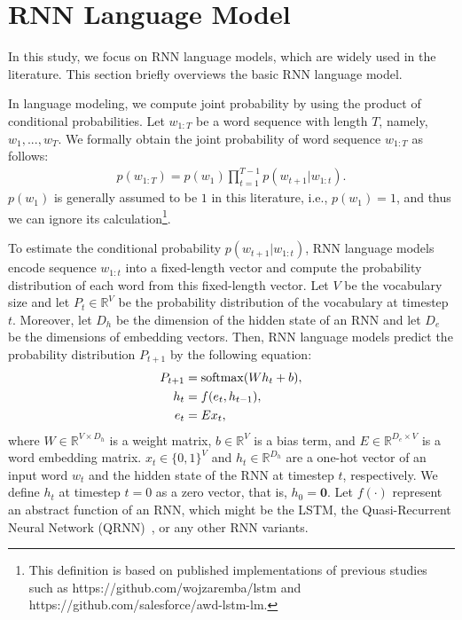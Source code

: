\documentclass[letterpaper]{article} %
\begin{document}
\section{RNN Language Model}
In this study, we focus on RNN language models, which are widely used in the literature.
This section briefly overviews the basic RNN language model.

In language modeling, we compute joint probability by using the product of conditional probabilities.
Let $w_{1:T}$ be a word sequence with length $T$, namely, $w_1, ..., w_T$.
We formally obtain the joint probability of word sequence $w_{1:T}$ as follows:
\begin{align}
  p(w_{1:T}) = p(w_1)\prod_{t=1}^{T-1} p(w_{t+1} | w_{1:t}). \label{eq:def_lm}
\end{align}
$p(w_1)$ is generally assumed to be $1$ in this literature, i.e., $p(w_1)\!=\!1$, and thus we can ignore its calculation\footnote{This definition is based on published implementations of previous studies such as https://github.com/wojzaremba/lstm and https://github.com/salesforce/awd-lstm-lm.}.


To estimate the conditional probability $p(w_{t+1} | w_{1:t})$, RNN language models encode sequence $w_{1:t}$ into a fixed-length vector and compute the probability distribution of each word from this fixed-length vector.
Let $V$ be the vocabulary size and let $P_{t} \in \mathbb{R}^{V}$ be the probability distribution of the vocabulary at timestep $t$.
Moreover, let $D_{h}$ be the dimension of the hidden state of an RNN and let $D_e$ be the dimensions of embedding vectors.
Then, RNN language models predict the probability distribution $P_{t+1}$ by the following equation:
\begin{align}
  P_{t+1} &= {\rm softmax}(W h_t + b), \label{eq:softmax} \\
  h_t &= f(e_t, h_{t-1}), \label{eq:rnn} \\
  e_t &= E x_t, \label{eq:embed}
\end{align}
where $W \in \mathbb{R}^{V \times D_h}$ is a weight matrix, $b \in \mathbb{R}^{V}$ is a bias term, and $E \in \mathbb{R}^{D_e \times V}$ is a word embedding matrix.
$x_t \in \{0,1\}^{V}$ and $h_{t} \in \mathbb{R}^{D_h}$ are a one-hot vector of an input word $w_t$ and the hidden state of the RNN at timestep $t$, respectively.
We define $h_{t}$ at timestep $t=0$ as a zero vector, that is, $h_0 = \bm{0}$.
Let $f(\cdot)$ represent an abstract function of an RNN, which might be the LSTM, the Quasi-Recurrent Neural Network (QRNN)~\cite{DBLP:journals/corr/BradburyMXS16}, or any other RNN variants.
\end{document}
